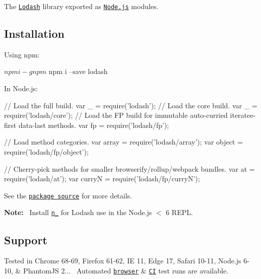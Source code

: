 The \href{https://lodash.com/}{\tt Lodash} library exported as \href{https://nodejs.org/}{\tt Node.\+js} modules.

\subsection*{Installation}

Using npm\+: 
\begin{DoxyCode}
$ npm i -g npm
$ npm i --save lodash
\end{DoxyCode}


In Node.\+js\+: 
\begin{DoxyCode}
// Load the full build.
var \_ = require('lodash');
// Load the core build.
var \_ = require('lodash/core');
// Load the FP build for immutable auto-curried iteratee-first data-last methods.
var fp = require('lodash/fp');

// Load method categories.
var array = require('lodash/array');
var object = require('lodash/fp/object');

// Cherry-pick methods for smaller browserify/rollup/webpack bundles.
var at = require('lodash/at');
var curryN = require('lodash/fp/curryN');
\end{DoxyCode}


See the \href{https://github.com/lodash/lodash/tree/4.17.11-npm}{\tt package source} for more details.

{\bfseries Note\+:}~\newline
 Install \href{https://www.npmjs.com/package/n_}{\tt n\+\_\+} for Lodash use in the Node.\+js $<$ 6 R\+E\+PL.

\subsection*{Support}

Tested in Chrome 68-\/69, Firefox 61-\/62, IE 11, Edge 17, Safari 10-\/11, Node.\+js 6-\/10, \& Phantom\+JS 2...~\newline
 Automated \href{https://saucelabs.com/u/lodash}{\tt browser} \& \href{https://travis-ci.org/lodash/lodash/}{\tt CI} test runs are available. 